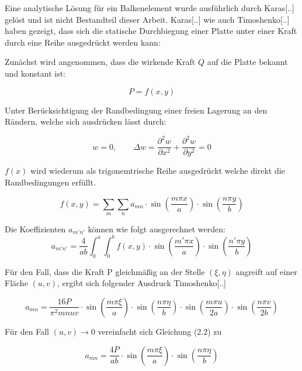 Eine analytische Lösung für ein Balkenelement wurde ausführlich durch Karas[..] gelöst und ist nicht Bestandteil dieser Arbeit.
Karas[..] wie auch Timoshenko[..] haben gezeigt, dass sich die statische Durchbiegung einer Platte unter einer Kraft durch eine Reihe ausgedrückt werden kann:


Zunächst wird angenommen, dass die wirkende Kraft $Q$ auf die Platte bekannt und konstant ist:

$$P = f(x,y)$$

Unter Berücksichtigung der Randbedingung einer freien Lagerung an den Rändern, welche sich ausdrücken lässt durch:

\begin{equation}
\tag{x=0,a; \quad y=0,b}w = 0, \qquad \Delta w = \dfrac{\partial^2 w}{\partial x^2} +  \dfrac{\partial^2 w}{\partial y^2} = 0
\end{equation}

$f(x)$ wird wiederum als trigonemtrische Reihe ausgedrückt welche direkt die Randbedingungen erfüllt.

\begin{equation} 
\tag{$m,n = 1, 2, 3, 4, ...$}f(x,y) = \sum_m \sum_n a_{mn} \cdot \sin\left(\dfrac{m \pi x}{a}\right) \cdot \sin\left(\dfrac{n \pi y}{b}\right)
\end{equation} 

Die Koeffizienten $a_{m'n'}$ können wie folgt ausgerechnet werden:
\begin{equation}
a_{m'n'} = \dfrac{4}{ab} \int_{0}^{a} \int_{0}^{b} f(x,y)\cdot \sin\left(\dfrac{m' \pi x}{a}\right) \cdot \sin\left(\dfrac{n' \pi y}{b}\right)
\end{equation}



Für den Fall, dass die Kraft P gleichmäßig an der Stelle $(\xi, \eta)$ angreift auf einer Fläche $(u,v)$, ergibt sich folgender Ausdruck Timoshenko[..]



\begin{equation}
a_{mn} = \dfrac{16P}{\pi^2 m n u v} 
\cdot \sin\left(\dfrac{m \pi \xi}{a}\right) 
\cdot \sin\left(\dfrac{n \pi \eta}{b}\right) 
\cdot \sin\left(\dfrac{m \pi u}{2a}\right) 
\cdot \sin\left(\dfrac{n \pi v}{2b}\right)
\end{equation}

Für den Fall $(u,v)\rightarrow 0$ vereinfacht sich Gleichung (2.2) zu

\begin{equation}
a_{mn} = \dfrac{4P}{a b} 
\cdot \sin\left(\dfrac{m \pi \xi}{a}\right) 
\cdot \sin\left(\dfrac{n \pi \eta}{b}\right) 
\end{equation}

